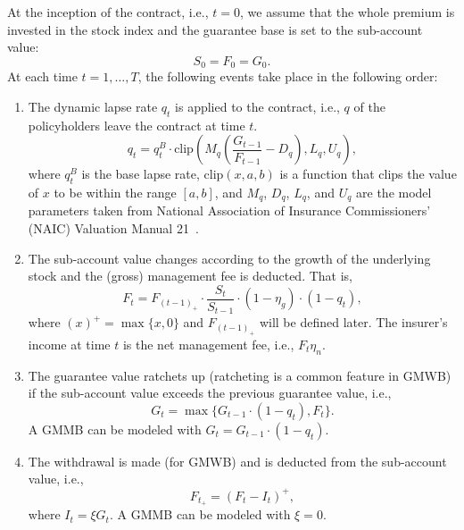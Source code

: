 At the inception of the contract, i.e., $t=0$, we assume that the whole premium is invested in the stock index and the guarantee base is set to the sub-account value:
\begin{equation*}
    S_0=F_0=G_0.
\end{equation*}
At each time $t=1,\ldots,T$, the following events take place in the following order:
\begin{enumerate}
    \item The dynamic lapse rate $q_t$ is applied to the contract, i.e., $q$ of the policyholders leave the contract at time $t$.
        \begin{equation} \label{eq3:lapse}
            q_t = q_t^B \cdot \text{clip} (M_q (\frac{G_{t-1}}{F_{t-1}} - D_q), L_q, U_q),
        \end{equation}
    where $q_t^B$ is the base lapse rate, $\text{clip}(x, a, b)$ is a function that clips the value of $x$ to be within the range $[a, b]$, and $M_q$, $D_q$, $L_q$, and $U_q$ are the model parameters taken from National Association of Insurance Commissioners’ (NAIC) Valuation Manual 21~\citep{naic2021}.
    \item The sub-account value changes according to the growth of the underlying stock and the (gross) management fee is deducted. That is, 
        \begin{equation} \label{eq3:subaccount}
            F_t = F_{(t-1)_+}\cdot\frac{S_{t}}{S_{t-1}}\cdot(1-\eta_g)\cdot(1-q_t),
        \end{equation} 
    where $(x)^+=\max\{x,0\}$ and $F_{(t-1)_+}$ will be defined later. The insurer's income at time $t$ is the net management fee, i.e., $F_t\eta_n$. 

    \item The guarantee value ratchets up (ratcheting is a common feature in GMWB) if the sub-account value exceeds the previous guarantee value, i.e., 
        \begin{equation} \label{eq3:guarantee}
            G_t = \max\{G_{t-1}\cdot(1-q_t),F_t\}.
        \end{equation} 
    A GMMB can be modeled with $G_t = G_{t-1}\cdot(1-q_t)$.

    \item The withdrawal is made (for GMWB) and is deducted from the sub-account value, i.e., 
        \begin{equation} \label{eq3:withdrawal}
            F_{t_+} = (F_t - I_t)^+,
        \end{equation} 
    where $I_t = \xi G_t$. A GMMB can be modeled with $\xi = 0$.
\end{enumerate}

